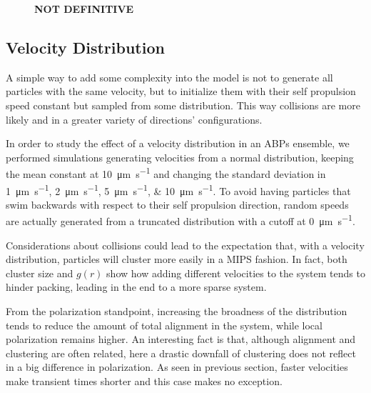 \documentclass[../../master_thesis_np.tex]{subfiles}
\begin{document}
\begin{figure}[htp]
			
			\caption{\textbf{NOT DEFINITIVE}  }
			\label{fig:lj_velocity_cluster}
		\end{figure}
		
		\subsection{Velocity Distribution}
		A simple way to add some complexity into the model is not to generate all particles with the same velocity, but to initialize them with their self propulsion speed constant but sampled from some distribution. 
		This way collisions are more likely and in a greater variety of directions' configurations.
		
		In order to study the effect of a velocity distribution in an ABPs ensemble, we performed simulations generating velocities from a normal distribution, keeping the mean constant at \SI{10}{\um \per \second} and changing the standard deviation in \qtylist{1; 2; 5; 10}{\um \per \second}.
		To avoid having particles that swim backwards with respect to their self propulsion direction, random speeds are actually generated from a truncated distribution with a cutoff at \SI{0}{\um \per \second}.
		
		Considerations about collisions could lead to the expectation that, with a velocity distribution, particles will cluster more easily in a MIPS fashion.
		In fact, both cluster size and $g(r)$ show how adding different velocities to the system tends to hinder packing, leading in the end to a more sparse system.
		
		From the polarization standpoint, increasing the broadness of the distribution tends to reduce the amount of total alignment in the system, while local polarization remains higher. 
		An interesting fact is that, although alignment and clustering are often related, here a drastic downfall of clustering does not reflect in a big difference in polarization.
		As seen in previous section, faster velocities make transient times shorter and this case makes no exception.
		
\end{document}
